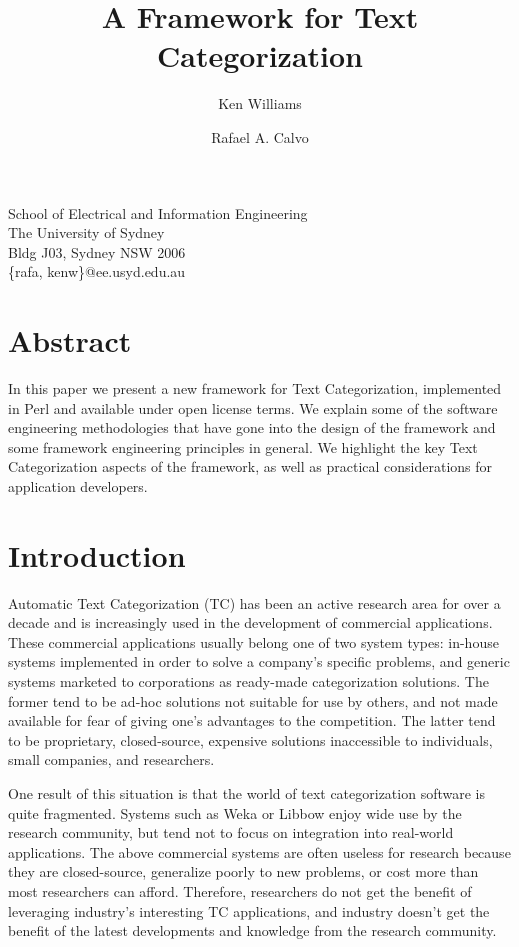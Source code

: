 \documentclass[a4paper,twocolumn]{article}
\title{A Framework for Text Categorization}
\author{Ken Williams \and Rafael A. Calvo}
\begin{document}
\maketitle

\begin{center}
School of Electrical and Information Engineering\\
The University of Sydney\\
Bldg J03, Sydney NSW 2006\\
\{rafa, kenw\}@ee.usyd.edu.au
\end{center}

\section{Abstract}

In this paper we present a new framework for Text Categorization, implemented in Perl and available under open license terms.  We explain some of the software engineering methodologies that have gone into the design of the framework and some framework engineering principles in general.  We highlight the key Text Categorization aspects of the framework, as well as practical considerations for application developers.

\section{Introduction}


Automatic Text Categorization (TC)  has been an active research area for over a decade and is increasingly used in the development of commercial applications.  These commercial applications usually belong one of two system types: in-house systems implemented in order to solve a company's specific problems, and generic systems marketed to corporations as ready-made categorization solutions.  The former tend to be ad-hoc solutions not suitable for use by others, and not made available for fear of giving one's advantages to the competition.  The latter tend to be proprietary, closed-source, expensive solutions inaccessible to individuals, small companies, and researchers.

One result of this situation is that the world of text categorization software is quite fragmented.  Systems such as Weka \cite{weka:99} or Libbow \cite{bow:96} enjoy wide use by the research community, but tend not to focus on integration into real-world applications.  The above commercial systems are often useless for research because they are closed-source, generalize poorly to new problems, or cost more than most researchers can afford.  Therefore, researchers do not get the benefit of leveraging industry's interesting TC applications, and industry doesn't get the benefit of the latest developments and knowledge from the research community.
\end{document}
